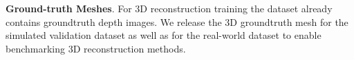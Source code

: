 \noindent\textbf{Ground-truth Meshes}. For 3D reconstruction training the \ASE{} dataset already contains groundtruth depth images. We release the 3D groundtruth mesh for the simulated \ASE{} validation dataset as well as for the real-world \ADT{} dataset to enable benchmarking 3D reconstruction methods. 









